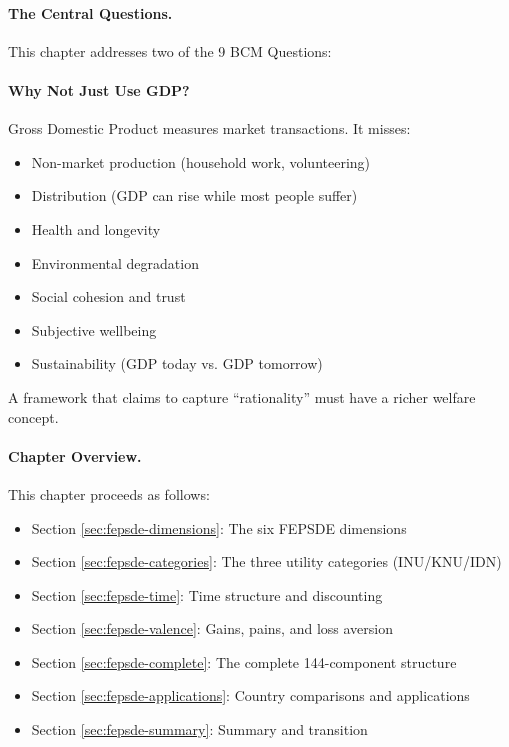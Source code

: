 \paragraph{The Central Questions.}
This chapter addresses two of the 9 BCM Questions:

\begin{center}
\end{center}

\paragraph{Why Not Just Use GDP?}
Gross Domestic Product measures market transactions. It misses:
\begin{itemize}[nosep]
  \item Non-market production (household work, volunteering)
  \item Distribution (GDP can rise while most people suffer)
  \item Health and longevity
  \item Environmental degradation
  \item Social cohesion and trust
  \item Subjective wellbeing
  \item Sustainability (GDP today vs. GDP tomorrow)
\end{itemize}

A framework that claims to capture ``rationality'' must have a richer welfare concept.

\paragraph{Chapter Overview.}
This chapter proceeds as follows:
\begin{itemize}
    \item Section \ref{sec:fepsde-dimensions}: The six FEPSDE dimensions
    \item Section \ref{sec:fepsde-categories}: The three utility categories (INU/KNU/IDN)
    \item Section \ref{sec:fepsde-time}: Time structure and discounting
    \item Section \ref{sec:fepsde-valence}: Gains, pains, and loss aversion
    \item Section \ref{sec:fepsde-complete}: The complete 144-component structure
    \item Section \ref{sec:fepsde-applications}: Country comparisons and applications
    \item Section \ref{sec:fepsde-summary}: Summary and transition
\end{itemize}


